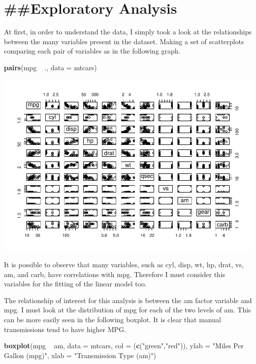 \documentclass[]{article}
\newenvironment{Shaded}{\begin{snugshade}}{\end{snugshade}}
\newcommand{\KeywordTok}[1]{\textcolor[rgb]{0.13,0.29,0.53}{\textbf{{#1}}}}
\newcommand{\DataTypeTok}[1]{\textcolor[rgb]{0.13,0.29,0.53}{{#1}}}
\newcommand{\StringTok}[1]{\textcolor[rgb]{0.31,0.60,0.02}{{#1}}}
\newcommand{\NormalTok}[1]{{#1}}
\begin{document}
\section{\#\#Exploratory Analysis}\label{exploratory-analysis}

At first, in order to understand the data, I simply took a look at the
relationships between the many variables present in the dataset. Making
a set of scatterplots comparing each pair of variables as in the
following graph.

\begin{Shaded}
\begin{Highlighting}[]
\KeywordTok{pairs}\NormalTok{(mpg ~}\StringTok{ }\NormalTok{., }\DataTypeTok{data =} \NormalTok{mtcars)}
\end{Highlighting}
\end{Shaded}

\includegraphics{regression_models_report_files/figure-latex/unnamed-chunk-2-1.pdf}

It is possible to observe that many variables, such as cyl, disp, wt,
hp, drat, vs, am, and carb, have correlations with mpg. Therefore I must
consider this variables for the fitting of the linear model too.

The relationship of interest for this analysis is between the am factor
variable and mpg. I must look at the distribution of mpg for each of the
two levels of am. This can be more easily seen in the following boxplot.
It is clear that manual transmissions tend to have higher MPG.

\begin{Shaded}
\begin{Highlighting}[]
\KeywordTok{boxplot}\NormalTok{(mpg ~}\StringTok{ }\NormalTok{am, }\DataTypeTok{data =} \NormalTok{mtcars, }\DataTypeTok{col =} \NormalTok{(}\KeywordTok{c}\NormalTok{(}\StringTok{"green"}\NormalTok{,}\StringTok{"red"}\NormalTok{)), }\DataTypeTok{ylab =} \StringTok{"Miles Per Gallon (mpg)"}\NormalTok{, }\DataTypeTok{xlab =} \StringTok{"Transmission Type (am)"}\NormalTok{)}
\end{Highlighting}
\end{Shaded}
\end{document}
